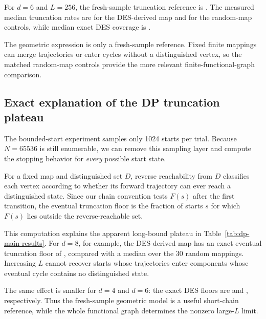 For $d=6$ and $L=256$, the fresh-sample truncation reference is
\DPDsixTheoryTrunc{}. The measured median truncation rates are
\DPDsixDESTrunc{} for the DES-derived map and \DPDsixRandomTrunc{} for the
random-map controls, while median exact DES coverage is
\DPDsixDESCoverage{}.

The geometric expression is only a fresh-sample reference. Fixed finite
mappings can merge trajectories or enter cycles without a distinguished
vertex, so the matched random-map controls provide the more relevant
finite-functional-graph comparison.

\subsection{Exact explanation of the DP truncation plateau}

The bounded-start experiment samples only 1024 starts per trial. Because
$N=65536$ is still enumerable, we can remove this sampling layer and compute
the stopping behavior for \emph{every} possible start state.

For a fixed map and distinguished set $D$, reverse reachability from $D$
classifies each vertex according to whether its forward trajectory can ever
reach a distinguished state. Since our chain convention tests $F(s)$ after the
first transition, the eventual truncation floor is the fraction of starts $s$
for which $F(s)$ lies outside the reverse-reachable set.

\begin{table}[ht]
\centering
\small

\caption{Exact whole-state distinguished-point truncation for the DES-derived
map and medians over 30 complete random mappings. The DES eventual floor is the
fraction of starts that can never reach a distinguished point after the first
transition, irrespective of the chain bound.}
\label{tab:dp-graph-results}
\end{table}

This computation explains the apparent long-bound plateau in
Table~\ref{tab:dp-main-results}. For $d=8$, for example, the DES-derived map
has an exact eventual truncation floor of \DPGraphDESFloorDEight{}, compared with
a median \DPGraphRandomFloorDEight{} over the 30 random mappings. Increasing $L$
cannot recover starts whose trajectories enter components whose eventual cycle
contains no distinguished state.

The same effect is smaller for $d=4$ and $d=6$: the exact DES floors are
\DPGraphDESFloorDFour{} and \DPGraphDESFloorDSix{}, respectively. Thus the
fresh-sample geometric model is a useful short-chain reference, while the
whole functional graph determines the nonzero large-$L$ limit.

